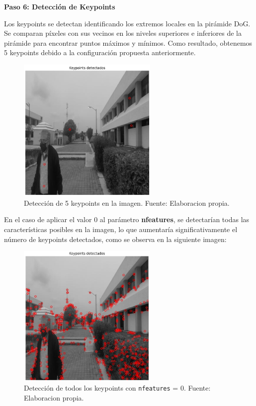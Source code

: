 \documentclass[a4paper]{article}
\begin{document}
\textbf{Paso 6: Detección de Keypoints}
\par\vspace{0.5cm}

Los keypoints se detectan identificando los extremos locales en la pirámide DoG. Se comparan píxeles con sus vecinos en los niveles superiores e inferiores de la pirámide para encontrar puntos máximos y mínimos. Como resultado, obtenemos 5 keypoints debido a la configuración propuesta anteriormente. 

\begin{figure}[H]
    \centering
    \includegraphics[width=0.6\textwidth]{images/sift_paso_5.1.png}
    \caption{Detección de 5 keypoints en la imagen. Fuente: Elaboracion propia.}
\end{figure}

En el caso de aplicar el valor 0 al parámetro \textbf{nfeatures}, se detectarían todas las características posibles en la imagen, lo que aumentaría significativamente el número de keypoints detectados, como se observa en la siguiente imagen:

\begin{figure}[H]
    \centering
    \includegraphics[width=0.6\textwidth]{images/sift_paso_5.png}
    \caption{Detección de todos los keypoints con \texttt{nfeatures} = 0. Fuente: Elaboracion propia.}
\end{figure}
\end{document}
